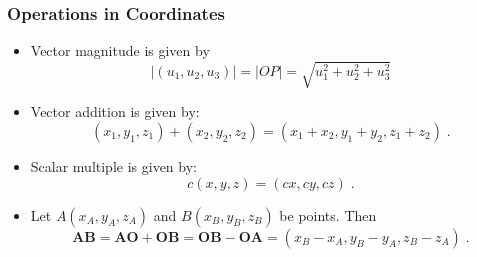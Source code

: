 \begin{frame}
\frametitle{Operations in Coordinates}
\begin{itemize}
\item<1-> Vector magnitude is given by
\[
|( u_1, u_2, u_3 )| = |OP| = \sqrt{u_1^2+u_2^2+u_3^2}
\]
\item<2-> Vector addition is given by:
\[
( x_1,y_1,z_1 ) + ( x_2, y_2,z_2) = ( x_1+x_2, y_1+y_2, z_1+z_2)\; .
\]
\item<3-> Scalar multiple is given by:
\[
c( x, y, z) = ( cx, cy, cz)\; .
\]
\item<4-> Let $A(x_A, y_A, z_A)$ and $B(x_B, y_B, z_B)$ be points. Then
\[
\bm{AB} = \bm{AO} +\bm{OB} = \bm{OB} - \bm{OA} = ( x_B-x_A, y_B-y_A, z_B-z_A) \; .
\]
\end{itemize}

\end{frame}
